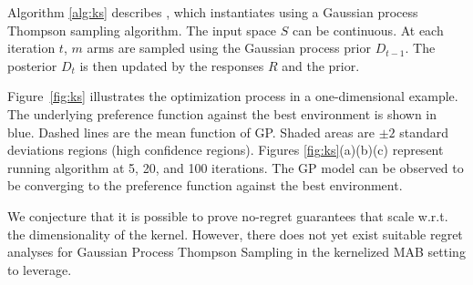 


Algorithm \ref{alg:ks} describes \kersparring, which instantiates \selfsparring using a Gaussian process Thompson sampling algorithm.
The input space $S$ can be continuous. 
At each iteration $t$, $m$ arms are sampled using the Gaussian process prior $D_{t-1}$. The posterior $D_t$ is then updated by the responses $R$ and the prior. 

Figure~\ref{fig:ks} illustrates the optimization process in a one-dimensional example. The underlying preference function against the best environment is shown in blue. Dashed lines are the mean function of GP. Shaded areas are $\pm 2$ standard deviations regions (high confidence regions). Figures \ref{fig:ks}(a)(b)(c) represent running \kersparring algorithm at 5, 20, and 100 iterations. The GP model can be observed to be converging to the preference function against the best environment.

We conjecture that it is possible to prove no-regret guarantees that scale w.r.t. the dimensionality of the kernel. However, there does not yet exist suitable regret analyses for Gaussian Process Thompson Sampling in the kernelized MAB setting to leverage.





